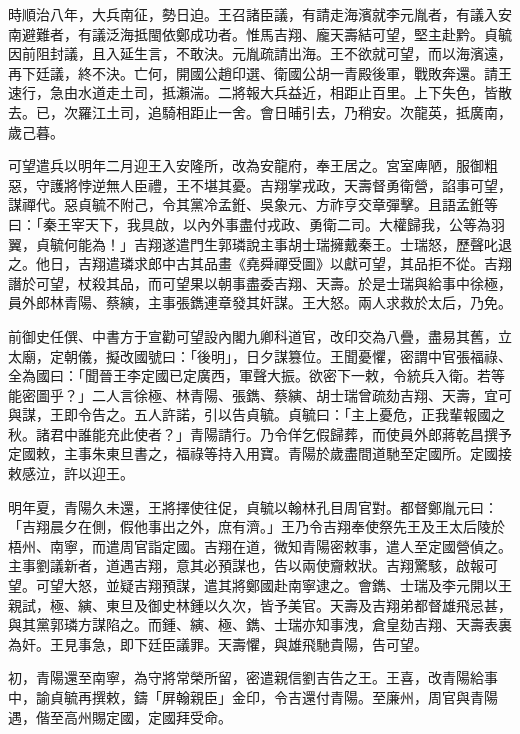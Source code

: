 \begin{pinyinscope}
時順治八年，大兵南征，勢日迫。王召諸臣議，有請走海濱就李元胤者，有議入安南避難者，有議泛海抵閩依鄭成功者。惟馬吉翔、龐天壽結可望，堅主赴黔。貞毓因前阻封議，且入延生言，不敢決。元胤疏請出海。王不欲就可望，而以海濱遠，再下廷議，終不決。亡何，開國公趙印選、衛國公胡一青殿後軍，戰敗奔還。請王速行，急由水道走土司，抵瀨湍。二將報大兵益近，相距止百里。上下失色，皆散去。已，次羅江土司，追騎相距止一舍。會日晡引去，乃稍安。次龍英，抵廣南，歲己暮。

可望遣兵以明年二月迎王入安隆所，改為安龍府，奉王居之。宮室庳陋，服御粗惡，守護將悖逆無人臣禮，王不堪其憂。吉翔掌戎政，天壽督勇衛營，諂事可望，謀禪代。惡貞毓不附己，令其黨冷孟銋、吳象元、方祚亨交章彈擊。且語孟銋等曰：「秦王宰天下，我具啟，以內外事盡付戎政、勇衛二司。大權歸我，公等為羽翼，貞毓何能為！」吉翔遂遣門生郭璘說主事胡士瑞擁戴秦王。士瑞怒，歷聲叱退之。他日，吉翔遣璘求郎中古其品畫《堯舜禪受圖》以獻可望，其品拒不從。吉翔譖於可望，杖殺其品，而可望果以朝事盡委吉翔、天壽。於是士瑞與給事中徐極，員外郎林青陽、蔡縯，主事張鐫連章發其奸謀。王大怒。兩人求救於太后，乃免。

前御史任僎、中書方于宣勸可望設內閣九卿科道官，改印交為八疊，盡易其舊，立太廟，定朝儀，擬改國號曰：「後明」，日夕謀篡位。王聞憂懼，密謂中官張福祿、全為國曰：「聞晉王李定國已定廣西，軍聲大振。欲密下一敕，令統兵入衛。若等能密圖乎？」二人言徐極、林青陽、張鐫、蔡縯、胡士瑞曾疏劾吉翔、天壽，宜可與謀，王即令告之。五人許諾，引以告貞毓。貞毓曰：「主上憂危，正我輩報國之秋。諸君中誰能充此使者？」青陽請行。乃令佯乞假歸葬，而使員外郎蔣乾昌撰予定國敕，主事朱東旦書之，福祿等持入用寶。青陽於歲盡間道馳至定國所。定國接敕感泣，許以迎王。

明年夏，青陽久未還，王將擇使往促，貞毓以翰林孔目周官對。都督鄭胤元曰：「吉翔晨夕在側，假他事出之外，庶有濟。」王乃令吉翔奉使祭先王及王太后陵於梧州、南寧，而遣周官詣定國。吉翔在道，微知青陽密敕事，遣人至定國營偵之。主事劉議新者，道遇吉翔，意其必預謀也，告以兩使齎敕狀。吉翔驚駭，啟報可望。可望大怒，並疑吉翔預謀，遣其將鄭國赴南寧逮之。會鐫、士瑞及李元開以王親試，極、縯、東旦及御史林鍾以久次，皆予美官。天壽及吉翔弟都督雄飛忌甚，與其黨郭璘方謀陷之。而鍾、縯、極、鐫、士瑞亦知事洩，倉皇劾吉翔、天壽表裏為奸。王見事急，即下廷臣議罪。天壽懼，與雄飛馳貴陽，告可望。

初，青陽還至南寧，為守將常榮所留，密遣親信劉吉告之王。王喜，改青陽給事中，諭貞毓再撰敕，鑄「屏翰親臣」金印，令吉還付青陽。至廉州，周官與青陽遇，偕至高州賜定國，定國拜受命。


\end{pinyinscope}
